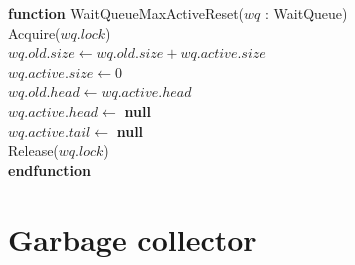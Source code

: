 \documentclass[a4paper,11pt]{article}
\newenvironment{program}{
  \begin{sffamily}
  \begin{scriptsize}
  \begin{tabbing}}
 {\end{tabbing}
  \end{scriptsize}
  \end{sffamily}}
\newcommand{\kw}[1]{\textsf{\textbf{#1}}}
\newcommand{\pindent}{\hspace{2em}\=}
\newcommand{\synchro}[1]{\textcolor{synchrocolor}{#1}}
\begin{document}
\label{WaitQueueMaxActiveReset}
\begin{program}
  \kw{function} WaitQueueMaxActiveReset($wq$ : WaitQueue) \\
  \pindent\synchro{Acquire($wq.lock$)} \\
  \>$wq.old.size \leftarrow wq.old.size + wq.active.size$ \\
  \>$wq.active.size \leftarrow 0$ \\
  \>$wq.old.head \leftarrow wq.active.head$ \\
  \>$wq.active.head \leftarrow$ \kw{null} \\
  \>$wq.active.tail \leftarrow$ \kw{null} \\
  \>\synchro{Release($wq.lock$)} \\
  \kw{endfunction}
\end{program}

\section{Garbage collector}
\end{document}
